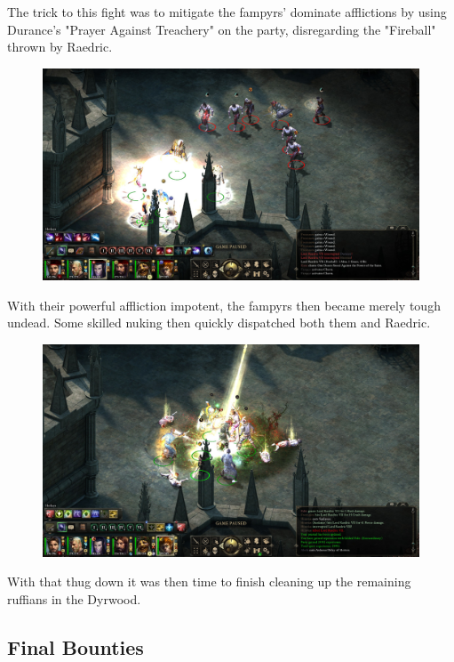 \documentclass{article}
\begin{document}
The trick to this fight was to mitigate the fampyrs' dominate afflictions by using Durance's "Prayer Against Treachery" on the party, disregarding the "Fireball" thrown by Raedric.

\begin{figure}
\includegraphics[scale=0.33]{files/blog/2019_03_04_pillars_of_eternity_path_of_the_damned_act_iii/2019_03_04_raedric2.jpg}
\end{figure}

With their powerful affliction impotent, the fampyrs then became merely tough undead.  Some skilled nuking then quickly dispatched both them and Raedric.

\begin{figure}
\includegraphics[scale=0.33]{files/blog/2019_03_04_pillars_of_eternity_path_of_the_damned_act_iii/2019_03_04_raedric3.jpg}
\end{figure}

With that thug down it was then time to finish cleaning up the remaining ruffians in the Dyrwood.

\subsection{Final Bounties}
\end{document}

